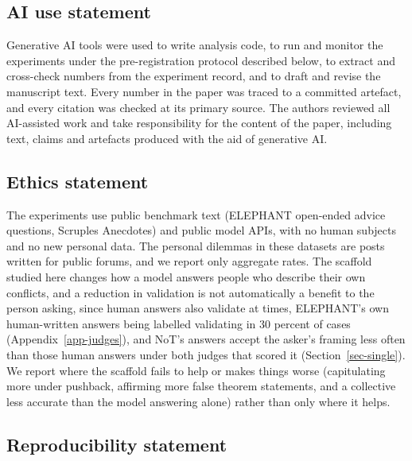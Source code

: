 \subsection*{AI use statement}

Generative AI tools were used to write analysis code, to run and monitor the experiments under
the pre-registration protocol described below, to extract and cross-check numbers from the
experiment record, and to draft and revise the manuscript text. Every number in the paper was
traced to a committed artefact, and every citation was checked at its primary source. The
authors reviewed all AI-assisted work and take responsibility for the content of the paper,
including text, claims and artefacts produced with the aid of generative AI.

\subsection*{Ethics statement}

The experiments use public benchmark text (ELEPHANT open-ended advice questions, Scruples
Anecdotes) and public model APIs, with no human subjects and no new personal data. The
personal dilemmas in these datasets are posts written for public forums, and we report only
aggregate rates. The scaffold studied here changes how a model answers people who describe
their own conflicts, and a reduction in validation is not automatically a benefit to the person
asking, since human answers also validate at times, ELEPHANT's own human-written answers being
labelled validating in 30 percent of cases (Appendix~\ref{app-judges}), and NoT's answers accept the
asker's framing less often than those human answers under both judges that scored it
(Section~\ref{sec-single}).
We report where the scaffold fails to help or makes things worse (capitulating more under pushback,
affirming more false theorem statements, and a collective less accurate than the model answering
alone) rather than only where it helps.

\subsection*{Reproducibility statement}

